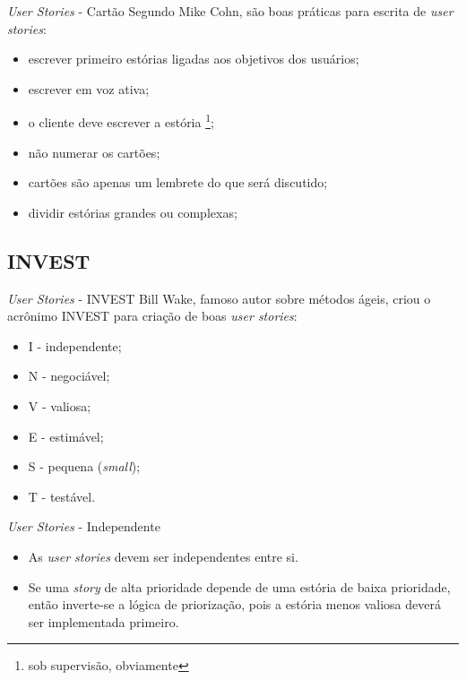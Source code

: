 \documentclass[11pt]{beamer}
\begin{document}
   \begin{frame}{\textit{User Stories} - Cartão}
      Segundo Mike Cohn, são boas práticas para escrita de \textit{user stories}:
      \begin{itemize}
         \item escrever primeiro estórias ligadas aos objetivos dos usuários;
         \item escrever em voz ativa;
         \item o cliente deve escrever a estória \footnote{sob supervisão, obviamente};
         \item não numerar os cartões;
         \item cartões são apenas um lembrete do que será discutido;
         \item dividir estórias grandes ou complexas;
      \end{itemize}
   \end{frame}

   \subsection{INVEST}

   \begin{frame}{\textit{User Stories} - INVEST}
      Bill Wake, famoso autor sobre métodos ágeis, criou o acrônimo INVEST para criação de boas \textit{user stories}:
      \begin{itemize}
         \item I - independente;
         \item N - negociável;
         \item V - valiosa;
         \item E - estimável;
         \item S - pequena (\textit{small});
         \item T - testável.
      \end{itemize}
   \end{frame}

   \begin{frame}{\textit{User Stories} - Independente}
      \begin{itemize}
         \item As \textit{user stories} devem ser independentes entre si.
         \item Se uma \textit{story} de alta prioridade depende de uma estória de baixa prioridade, então inverte-se a lógica de priorização, pois a estória menos valiosa deverá ser implementada primeiro.
      \end{itemize}
   \end{frame}
\end{document}
